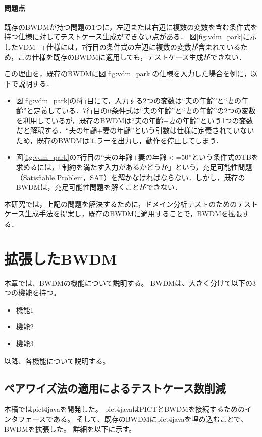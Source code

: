 \documentclass[uplatex, report, a4j, 10pt]{jsbook}
\newcommand{\tool}{BWDM}
\begin{document}
\subsubsection{問題点}\label{sec:bwdm_problem}
既存のBWDMが持つ問題の1つに，左辺または右辺に複数の変数を含む条件式を持つ仕様に対してテストケース生成ができない点がある．
図\ref{fig:vdm_park}に示したVDM++仕様には，7行目の条件式の左辺に複数の変数が含まれているため，この仕様を既存のBWDMに適用しても，テストケース生成ができない．

この理由を，既存のBWDMに図\ref{fig:vdm_park}の仕様を入力した場合を例に，以下で説明する．

\begin{itemize}
	\item 図\ref{fig:vdm_park}の6行目にて，入力する2つの変数は“夫の年齢”と“妻の年齢”と定義している．7行目のif条件式は“夫の年齢”と“妻の年齢”の2つの変数を利用しているが，既存のBWDMは“夫の年齢+妻の年齢”という1つの変数だと解釈する．“夫の年齢+妻の年齢”という引数は仕様に定義されていないため，既存のBWDMはエラーを出力し，動作を停止してしまう．
	\item 図\ref{fig:vdm_park}の7行目の“夫の年齢+妻の年齢$<$=50”という条件式のTBを求めるには，「制約を満たす入力があるかどうか」という，充足可能性問題（Satisfiable Problem，SAT）を解かなければならない．しかし，既存のBWDMは，充足可能性問題を解くことができない．
\end{itemize}

本研究では，上記の問題を解決するために，ドメイン分析テストのためのテストケース生成手法を提案し，既存のBWDMに適用することで，BWDMを拡張する．


\chapter{拡張した\tool{}}\label{cha:Extended}

本章では、\tool{}の機能について説明する。
\tool{}は、大きく分けて以下の3つの機能を持つ。

\begin{itemize}
  \item 機能1
  \item 機能2
  \item 機能3
\end{itemize}

以降、各機能について説明する。

\section{ペアワイズ法の適用によるテストケース数削減}
本稿ではpict4javaを開発した。
pict4javaはPICTとBWDMを接続するためのインタフェースである。
そして、既存のBWDMにpict4javaを埋め込むことで、BWDMを拡張した。
詳細を以下に示す。
\end{document}
